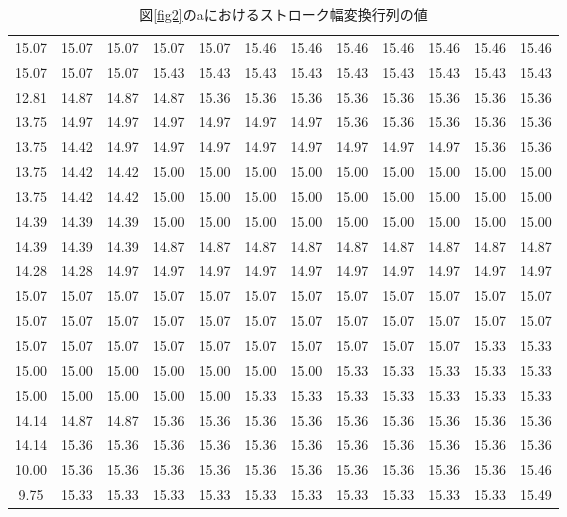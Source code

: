 \documentclass[uplatex, twocolumn,10pt]{jsarticle}
\begin{document}
\begin{table*}[tp]
    \centering
    \caption{図\ref{fig2}のaにおけるストローク幅変換行列の値}
    \label{table1}
    \begin{tabular}{cccccccccccc}
        \hline
        15.07 & 15.07 & 15.07 & 15.07 & 15.07 & 15.46 & 15.46 & 15.46 & 15.46 & 15.46 & 15.46 & 15.46 \\
        15.07 & 15.07 & 15.07 & 15.43 & 15.43 & 15.43 & 15.43 & 15.43 & 15.43 & 15.43 & 15.43 & 15.43 \\
        12.81 & 14.87 & 14.87 & 14.87 & 15.36 & 15.36 & 15.36 & 15.36 & 15.36 & 15.36 & 15.36 & 15.36 \\
        13.75 & 14.97 & 14.97 & 14.97 & 14.97 & 14.97 & 14.97 & 15.36 & 15.36 & 15.36 & 15.36 & 15.36 \\
        13.75 & 14.42 & 14.97 & 14.97 & 14.97 & 14.97 & 14.97 & 14.97 & 14.97 & 14.97 & 15.36 & 15.36 \\
        13.75 & 14.42 & 14.42 & 15.00 & 15.00 & 15.00 & 15.00 & 15.00 & 15.00 & 15.00 & 15.00 & 15.00 \\
        13.75 & 14.42 & 14.42 & 15.00 & 15.00 & 15.00 & 15.00 & 15.00 & 15.00 & 15.00 & 15.00 & 15.00 \\
        14.39 & 14.39 & 14.39 & 15.00 & 15.00 & 15.00 & 15.00 & 15.00 & 15.00 & 15.00 & 15.00 & 15.00 \\
        14.39 & 14.39 & 14.39 & 14.87 & 14.87 & 14.87 & 14.87 & 14.87 & 14.87 & 14.87 & 14.87 & 14.87 \\
        14.28 & 14.28 & 14.97 & 14.97 & 14.97 & 14.97 & 14.97 & 14.97 & 14.97 & 14.97 & 14.97 & 14.97 \\
        15.07 & 15.07 & 15.07 & 15.07 & 15.07 & 15.07 & 15.07 & 15.07 & 15.07 & 15.07 & 15.07 & 15.07 \\
        15.07 & 15.07 & 15.07 & 15.07 & 15.07 & 15.07 & 15.07 & 15.07 & 15.07 & 15.07 & 15.07 & 15.07 \\
        15.07 & 15.07 & 15.07 & 15.07 & 15.07 & 15.07 & 15.07 & 15.07 & 15.07 & 15.07 & 15.33 & 15.33 \\
        15.00 & 15.00 & 15.00 & 15.00 & 15.00 & 15.00 & 15.00 & 15.33 & 15.33 & 15.33 & 15.33 & 15.33 \\
        15.00 & 15.00 & 15.00 & 15.00 & 15.00 & 15.33 & 15.33 & 15.33 & 15.33 & 15.33 & 15.33 & 15.33 \\
        14.14 & 14.87 & 14.87 & 15.36 & 15.36 & 15.36 & 15.36 & 15.36 & 15.36 & 15.36 & 15.36 & 15.36 \\
        14.14 & 15.36 & 15.36 & 15.36 & 15.36 & 15.36 & 15.36 & 15.36 & 15.36 & 15.36 & 15.36 & 15.36 \\
        10.00 & 15.36 & 15.36 & 15.36 & 15.36 & 15.36 & 15.36 & 15.36 & 15.36 & 15.36 & 15.36 & 15.46 \\
        9.75  & 15.33 & 15.33 & 15.33 & 15.33 & 15.33 & 15.33 & 15.33 & 15.33 & 15.33 & 15.33 & 15.49 \\
        \hline
    \end{tabular}
\end{table*}
\end{document}
